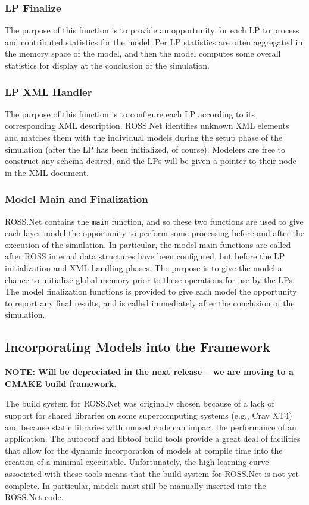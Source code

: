 \documentclass[12pt]{article}
\begin{document}
\subsubsection{LP Finalize}

The purpose of this function is to provide an opportunity for each LP to
process and contributed statistics for the model.  Per LP statistics are often
aggregated in the memory space of the model, and then the model computes some
overall statistics for display at the conclusion of the simulation.

\subsubsection{LP XML Handler}

The purpose of this function is to configure each LP according to its
corresponding XML description.  ROSS.Net identifies unknown XML elements and
matches them with the individual models during the setup phase of the
simulation (after the LP has been initialized, of course).  Modelers are free
to construct any schema desired, and the LPs will be given a pointer to their
node in the XML document.

\subsubsection{Model Main and Finalization}

ROSS.Net contains the {\tt main} function, and so these two functions are used
to give each layer model the opportunity to perform some processing before and
after the execution of the simulation.  In particular, the model main
functions are called after ROSS internal data structures have been configured,
but before the LP initialization and XML handling phases.  The purpose is to
give the model a chance to initialize global memory prior to these operations
for use by the LPs.  The model finalization functions is provided to give each
model the opportunity to report any final results, and is called immediately
after the conclusion of the simulation.

\subsection{Incorporating Models into the Framework}

{\bf NOTE: Will be depreciated in the next release -- we are moving to a CMAKE
  build framework}.

The build system for ROSS.Net was originally chosen because of a lack of
support for shared libraries on some supercomputing systems (e.g., Cray XT4)
and because static libraries with unused code can impact the performance of an
application.  The autoconf and libtool build tools provide a great deal of
facilities that allow for the dynamic incorporation of models at compile time
into the creation of a minimal executable.  Unfortunately, the high learning
curve associated with these tools means that the build system for ROSS.Net is
not yet complete.  In particular, models must still be manually inserted into
the ROSS.Net code.
\end{document}
